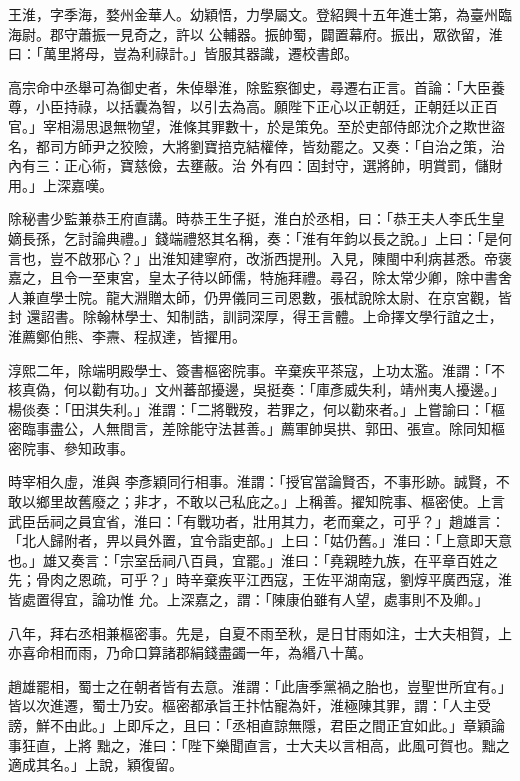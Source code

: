 \begin{pinyinscope}
 王淮，字季海，婺州金華人。幼穎悟，力學屬文。登紹興十五年進士第，為臺州臨海尉。郡守蕭振一見奇之，許以
 公輔器。振帥蜀，闢置幕府。振出，眾欲留，淮曰：「萬里將母，豈為利祿計。」皆服其器識，遷校書郎。



 高宗命中丞舉可為御史者，朱倬舉淮，除監察御史，尋遷右正言。首論：「大臣養尊，小臣持祿，以括囊為智，以引去為高。願陛下正心以正朝廷，正朝廷以正百官。」宰相湯思退無物望，淮條其罪數十，於是策免。至於吏部侍郎沈介之欺世盜名，都司方師尹之狡險，大將劉寶掊克結權倖，皆劾罷之。又奏：「自治之策，治內有三：正心術，寶慈儉，去壅蔽。治
 外有四：固封守，選將帥，明賞罰，儲財用。」上深嘉嘆。



 除秘書少監兼恭王府直講。時恭王生子挺，淮白於丞相，曰：「恭王夫人李氏生皇嫡長孫，乞討論典禮。」錢端禮怒其名稱，奏：「淮有年鈞以長之說。」上曰：「是何言也，豈不啟邪心？」出淮知建寧府，改浙西提刑。入見，陳閩中利病甚悉。帝褒嘉之，且令一至東宮，皇太子待以師儒，特施拜禮。尋召，除太常少卿，除中書舍人兼直學士院。龍大淵贈太師，仍畀儀同三司恩數，張栻說除太尉、在京宮觀，皆封
 還詔書。除翰林學士、知制誥，訓詞深厚，得王言體。上命擇文學行誼之士，淮薦鄭伯熊、李燾、程叔達，皆擢用。



 淳熙二年，除端明殿學士、簽書樞密院事。辛棄疾平茶寇，上功太濫。淮謂：「不核真偽，何以勸有功。」文州蕃部擾邊，吳挺奏：「庫彥威失利，靖州夷人擾邊。」楊倓奏：「田淇失利。」淮謂：「二將戰歿，若罪之，何以勸來者。」上嘗諭曰：「樞密臨事盡公，人無間言，差除能守法甚善。」薦軍帥吳拱、郭田、張宣。除同知樞密院事、參知政事。



 時宰相久虛，淮與
 李彥穎同行相事。淮謂：「授官當論賢否，不事形跡。誠賢，不敢以鄉里故舊廢之；非才，不敢以己私庇之。」上稱善。擢知院事、樞密使。上言武臣岳祠之員宜省，淮曰：「有戰功者，壯用其力，老而棄之，可乎？」趙雄言：「北人歸附者，畀以員外置，宜令詣吏部。」上曰：「姑仍舊。」淮曰：「上意即天意也。」雄又奏言：「宗室岳祠八百員，宜罷。」淮曰：「堯親睦九族，在平章百姓之先；骨肉之恩疏，可乎？」時辛棄疾平江西寇，王佐平湖南寇，劉焞平廣西寇，淮皆處置得宜，論功惟
 允。上深嘉之，謂：「陳康伯雖有人望，處事則不及卿。」



 八年，拜右丞相兼樞密事。先是，自夏不雨至秋，是日甘雨如注，士大夫相賀，上亦喜命相而雨，乃命口算諸郡絹錢盡蠲一年，為緡八十萬。



 趙雄罷相，蜀士之在朝者皆有去意。淮謂：「此唐季黨禍之胎也，豈聖世所宜有。」皆以次進遷，蜀士乃安。樞密都承旨王抃怙寵為奸，淮極陳其罪，謂：「人主受謗，鮮不由此。」上即斥之，且曰：「丞相直諒無隱，君臣之間正宜如此。」章穎論事狂直，上將
 黜之，淮曰：「陛下樂聞直言，士大夫以言相高，此風可賀也。黜之適成其名。」上說，穎復留。




\end{pinyinscope}
